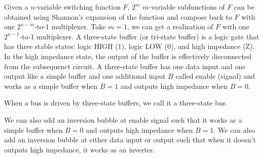 \documentclass[a4paper,12pt]{article}
\begin{document}
\begin{itemize}
\begin{itemize}
\begin{itemize}
\begin{itemize}
\begin{itemize}
\begin{itemize}
\begin{itemize}
Given a $n$-variable switching function $F$, $2^m$ $m$-variable subfunctions of $F$ can be obtained using Shannon's expansion of the function and compose back to $F$ with one $2^{n-m}$-to-1 multiplexer. Take $m=1$, we can get a realization of $F$ with one $2^{n-1}$-to-1 multiplexer.
A three-state buffer (or tri-state buffer) is a logic gate that has three stable states: logic HIGH (1), logic LOW (0), and high impedance (Z). In the high impedance state, the output of the buffer is effectively disconnected from the subsequenct circuit. A three-state buffer has one data input and one output like a simple buffer and one additional input $B$ called enable (signal) and works as a simple buffer when $B=1$ and outputs high impedance when $B=0$.

When a bus is driven by three-state buffers, we call it a three-state bus.

We can also add an inversion bubble at enable signal such that it works as a simple buffer when $B=0$ and outputs high impedance when $B=1$. We can also add an inversion bubble at either data input or output such that when it doesn't outputs high impedance, it works as an inverter.


\end{itemize}
\end{itemize}
\end{itemize}
\end{itemize}
\end{itemize}
\end{itemize}
\end{itemize}
\end{document}
